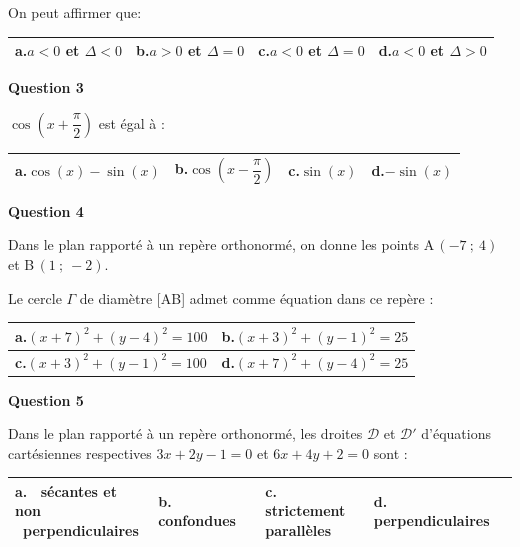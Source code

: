 \documentclass[10pt]{article}
\begin{document}
On peut affirmer que:

\medskip

{\renewcommand{\arraystretch}{1.5}
\begin{tabularx}{\linewidth}{|X|X|X|X|}
\hline
\textbf{a.}\quad $a<0$ et $\Delta<0$
& \textbf{b.}\quad $a>0$ et $\Delta=0$ 
& \textbf{c.}\quad $a<0$ et $\Delta=0$
& \textbf{d.}\quad $a<0$ et $\Delta>0$\\
\hline
\end{tabularx}}

\bigskip

\textbf{Question 3}

\medskip

$\cos \left (x+\dfrac{\pi}{2}\right)$ est égal à :

\medskip

{
\begin{tabularx}{\linewidth}{|X|X|X|X|}
\hline
\textbf{a.}\quad $\cos(x)-\sin(x)$
& \textbf{b.}\quad $\cos \left (x-\dfrac{\pi}{2}\right )$\rule[-10pt]{0pt}{25pt}
& \textbf{c.}\quad $\sin(x)$
& \textbf{d.}\quad $-\sin(x)$\\
\hline
\end{tabularx}}



\textbf{Question 4}

\medskip

Dans le plan rapporté à un repère orthonormé, on donne les points A\,$(-7~;~4)$ et B\,$(1~;~-2)$.

Le cercle $\Gamma$ de diamètre [AB] admet comme équation dans ce repère :

\medskip

{\renewcommand{\arraystretch}{1.5}
\begin{tabularx}{\linewidth}{|X|X|}
\hline
\textbf{a.}\quad $(x+7)^2+(y-4)^2=100$
& \textbf{b.}\quad $(x+3)^2+(y-1)^2=25$\\
\hline
 \textbf{c.}\quad $(x+3)^2+(y-1)^2=100$
& \textbf{d.}\quad $(x+7)^2+(y-4)^2=25$\\
\hline
\end{tabularx}}

\bigskip

\textbf{Question 5}

\medskip

Dans le plan rapporté à un repère orthonormé, les droites $\mathcal{D}$ et $\mathcal{D}'$ d'équations cartésiennes respectives $3x+2y-1=0$  et $6x+4y+2=0$ sont :

\medskip

{\renewcommand{\arraystretch}{3}
\begin{tabularx}{\linewidth}{|X|X|X|X|}
\hline
\shortstack{\textbf{a.}~ sécantes et non\\~perpendiculaires}
& \shortstack{\textbf{b.}~ confondues\\\phantom{confondues}}
& \shortstack{\textbf{c.}~ strictement\\parallèles}
& \shortstack{\textbf{d.}~ perpendiculaires\\\phantom{confondues}}\\
\hline
\end{tabularx}}

\vspace{0.5cm}
\end{document}
